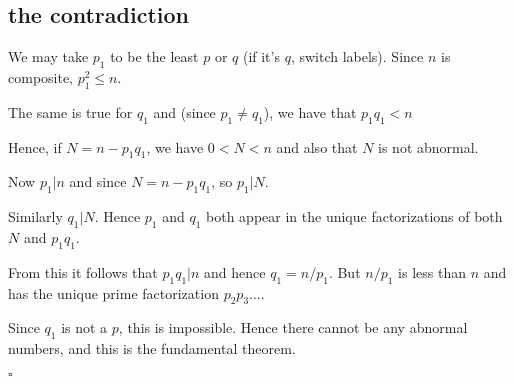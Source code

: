 \documentclass[11pt, oneside]{article}
\begin{document}
\subsection*{the contradiction}

We may take $p_1$ to be the least $p$ or $q$ (if it's $q$, switch labels).  Since $n$ is composite, $p_1^2 \le n$.

The same is true for $q_1$ and (since $p_1 \ne q_1$), we have that $p_1 q_1 < n$

Hence, if $N = n - p_1 q_1$, we have $0 < N < n$ and also that $N$ is not abnormal.

Now $p_1 | n$ and since $N = n - p_1 q_1$, so $p_1 | N$.

Similarly $q_1 | N$.  Hence $p_1$ and $q_1$ both appear in the unique factorizations of both $N$ and $p_1 q_1$.

From this it follows that $p_1 q_1 | n$ and hence $q_1 = n/p_1$.  But $n/p_1$ is less than $n$ and has the unique prime factorization $p_2 p_3 \dots$.

Since $q_1$ is not a $p$, this is impossible.  Hence there cannot be any abnormal numbers, and this is the fundamental theorem.

$\square$
\end{document}

